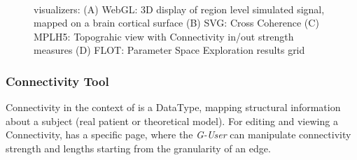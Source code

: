  \begin{figure}
	\qquad
	\\
	\qquad
	\caption{\TVB visualizers: 
	(A) WebGL: 3D display of region level simulated signal, mapped on a brain cortical surface
	(B) SVG: Cross Coherence
	(C) MPLH5:  Topograhic view with Connectivity in/out strength measures
	(D) FLOT: Parameter Space Exploration results grid}
        \label{fig:viewers}
\end{figure}

	\subsubsection{Connectivity Tool}

Connectivity in the context of \TVB is a DataType, mapping structural information about a subject (real patient or theoretical model).
For editing and viewing a Connectivity, \TVB has a specific page, where the \emph{G-User} can manipulate connectivity strength and lengths 
starting from the granularity of an edge.

